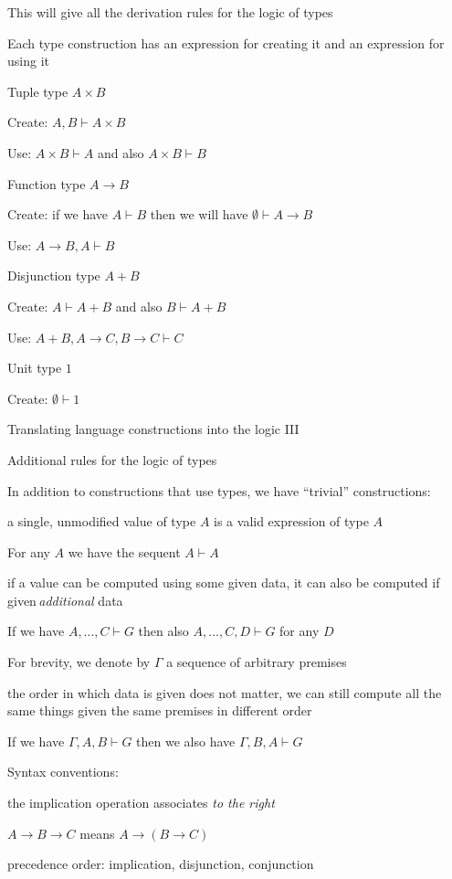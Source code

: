 This will give all the derivation rules for the logic of types

Each type construction has an expression for creating it and an expression
for using it

Tuple type $A\times B$

Create: $A,B\vdash A\times B$ 

Use: $A\times B\vdash A$ and also $A\times B\vdash B$

Function type $A\rightarrow B$

Create: if we have $A\vdash B$ then we will have $\emptyset\vdash A\rightarrow B$ 

Use: $A\rightarrow B,A\vdash B$

Disjunction type $A+B$

Create: $A\vdash A+B$ and also $B\vdash A+B$

Use: $A+B,A\rightarrow C,B\rightarrow C\vdash C$

Unit type $1$

Create: $\emptyset\vdash1$

Translating language constructions into the logic III

Additional rules for the logic of types

In addition to constructions that use types, we have \textsf{``}trivial\textsf{''}
constructions:

a single, unmodified value of type $A$ is a valid expression of type
$A$

For any $A$ we have the sequent $A\vdash A$

if a value can be computed using some given data, it can also be computed
if given\,\emph{additional} data

If we have $A,...,C\vdash G$ then also $A,...,C,D\vdash G$ for any
$D$

For brevity, we denote by $\Gamma$ a sequence of arbitrary premises

the order in which data is given does not matter, we can still compute
all the same things given the same premises in different order

If we have $\Gamma,A,B\vdash G$ then we also have $\Gamma,B,A\vdash G$

Syntax conventions:

the implication operation associates \emph{to the right}

$A\rightarrow B\rightarrow C$ means $A\rightarrow\left(B\rightarrow C\right)$

precedence order: implication, disjunction, conjunction


